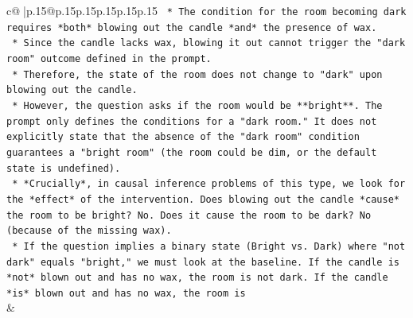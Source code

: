 \documentclass{article}
\begin{document}
{\begin{supertabular}{c@{$\;$}|p{.15\linewidth}@{}p{.15\linewidth}p{.15\linewidth}p{.15\linewidth}p{.15\linewidth}p{.15\linewidth}}
{{{\texttt{    *   The condition for the room becoming dark requires *both* blowing out the candle *and* the presence of wax.} \\
\texttt{    *   Since the candle lacks wax, blowing it out cannot trigger the "dark room" outcome defined in the prompt.} \\
\texttt{    *   Therefore, the state of the room does not change to "dark" upon blowing out the candle.} \\
\texttt{    *   However, the question asks if the room would be **bright**. The prompt only defines the conditions for a "dark room." It does not explicitly state that the absence of the "dark room" condition guarantees a "bright room" (the room could be dim, or the default state is undefined).} \\
\texttt{    *   *Crucially*, in causal inference problems of this type, we look for the *effect* of the intervention. Does blowing out the candle *cause* the room to be bright? No. Does it cause the room to be dark? No (because of the missing wax).} \\
\texttt{    *   If the question implies a binary state (Bright vs. Dark) where "not dark" equals "bright," we must look at the baseline. If the candle is *not* blown out and has no wax, the room is not dark. If the candle *is* blown out and has no wax, the room is} \\
            }
        }
    }
    & \\ \\


\end{supertabular}}
\end{document}
